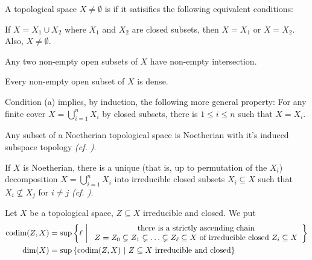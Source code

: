\documentclass[a4paper,parskip=half,numbers=enddot, DIV=12]{scrreprt}
\begin{document}
\begin{defi}
	A topological space $X\not=\emptyset$ is  if it satisifies the following equivalent conditions:
	\begin{alphanumerate}
		\item If $X = X_1\cup X_2$ where $X_1$ and $X_2$ are closed subsets, then $X=X_1$ or $X=X_2$. Also, $X\neq\emptyset$.
		\item Any two non-empty open subsets of $X$ have non-empty intersection.
		\item Every non-empty open subset of $X$ is dense.
	\end{alphanumerate}
\end{defi}
Condition (a) implies, by induction, the following more general property: 
For any finite cover $X= \bigcup_{i=1}^n X_i$ by closed subsets, there is $1\leq i\leq n$ such that $X=X_i$.
\begin{prop}
	\begin{alphanumerate}
		\item 
		Any subset of a Noetherian topological space is Noetherian with it's induced subspace topology \emph{(cf. \cite[Remark~2.2.1]{alg1})}. 
		\item 
		If $X$ is Noetherian, there is a unique (that is, up to permutation of the $X_i$) decomposition $X = \bigcup_{i=1}^n X_i$ into irreducible closed subsets $X_i\subseteq X$ such that $X_i\not\subseteq X_j$ for $i\neq j$ \emph{(cf. \cite[Proposition~2.1.1]{alg1})}.
	\end{alphanumerate}
	
\end{prop}
\begin{defi}
	Let $X$ be a topological space, $Z\subseteq X$ irreducible and closed. We put 
	\begin{align*}
	\operatorname{codim}(Z,X) &= \sup\left\{\ell\ \middle|\  
	\begin{array}{c}
	\text{there is a strictly ascending chain}\\
	Z=Z_0 \subsetneq Z_1\subsetneq \ldots \subsetneq Z_\ell\subseteq X\text{ of irreducible closed }Z_i\subseteq X
	\end{array}\right\}\\
	\dim(X) &= \sup\left\{\operatorname{codim}(Z,X)\ \middle|\  Z\subseteq X \text{ irreducible and closed}\right\}
	\end{align*}
\end{defi}
\end{document}
